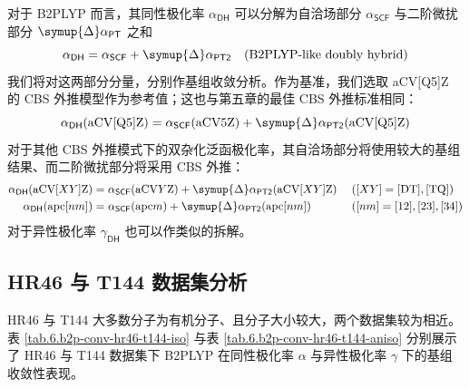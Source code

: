 对于 B2PLYP 而言，其同性极化率 $\alpha_\textsf{DH}$ 可以分解为自洽场部分 $\alpha_\textsf{SCF}$ 与二阶微扰部分 $\symup{\Delta} \alpha_\textsf{PT}$ 之和
\begin{equation*}
    \alpha_\textsf{DH} = \alpha_\textsf{SCF} + \symup{\Delta} \alpha_\textsf{PT2} \quad \text{(B2PLYP-like doubly hybrid)}
\end{equation*}
我们将对这两部分分量，分别作基组收敛分析。作为基准，我们选取 aCV[Q5]Z 的 CBS 外推模型作为参考值；这也与第五章的最佳 CBS 外推标准相同：
\begin{equation*}
    \alpha_\textsf{DH} (\text{aCV[Q5]Z}) = \alpha_\textsf{SCF} (\text{aCV5Z}) + \symup{\Delta} \alpha_\textsf{PT2} (\text{aCV[Q5]Z})
\end{equation*}
对于其他 CBS 外推模式下的双杂化泛函极化率，其自洽场部分将使用较大的基组结果、而二阶微扰部分将采用 CBS 外推：
\begin{align*}
    \alpha_\textsf{DH} (\text{aCV}[XY]\text{Z}) &= \alpha_\textsf{SCF} (\text{aCV}Y\text{Z}) + \symup{\Delta} \alpha_\textsf{PT2} (\text{aCV}[XY]\text{Z}) \; &&([XY] = \mathrm{[DT], [TQ]}) \\
    \alpha_\textsf{DH} (\text{apc}[nm]) &= \alpha_\textsf{SCF} (\text{apc}m) + \symup{\Delta} \alpha_\textsf{PT2} (\text{apc}[nm]) \; &&([nm] = [12], [23], [34])
\end{align*}
对于异性极化率 $\gamma_\textsf{DH}$ 也可以作类似的拆解。

\subsection{HR46 与 T144 数据集分析}

HR46 与 T144 大多数分子为有机分子、且分子大小较大，两个数据集较为相近。表 \ref{tab.6.b2p-conv-hr46-t144-iso} 与表 \ref{tab.6.b2p-conv-hr46-t144-aniso} 分别展示了 HR46 与 T144 数据集下 B2PLYP 在同性极化率 $\alpha$ 与异性极化率 $\gamma$ 下的基组收敛性表现。

